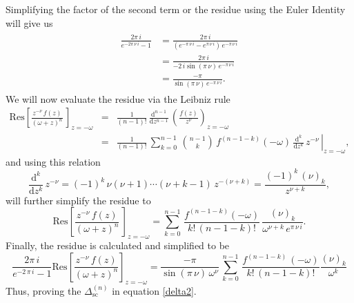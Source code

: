 Simplifying the factor of the second term or the residue using the Euler Identity will give us 
\begin{align}
\begin{split}
	\frac{2\pi\,i}{e^{-2\pi\,\nu\,i}-1} &=\frac{2\pi\,i}{\left(e^{-\pi\,\nu\,i}-e^{\pi\,\nu\,i}\right)\,e^{-\pi\,\nu\,i}} \\& =\frac{2\pi\,i}{-2\,i\sin\left(\pi\,\nu\right)\,e^{-\pi\,\nu\,i}} \\& =\frac{-\pi}{\sin\left(\pi\,\nu\right)\,e^{-\pi\,\nu\,i}}.
\end{split}
\end{align}
We will now evaluate the residue via the Leibniz rule
\begin{eqnarray}\nonumber
	\mathrm{Res}\left[\frac{z^{-\nu}\,f\left(z\right)}{\left(\omega+z\right)^{n}}\,\right]_{z=-\omega} &=&\frac{1}{\left(n-1\right)!}\,\frac{\mathrm{d}^{n-1}}{\mathrm{d}z^{n-1}}\,\left(\frac{f\left(z\right)}{z^{\nu}}\right)_{z=-\omega}\nonumber\\\nonumber
	&=&\frac{1}{\left(n-1\right)!}\,\sum_{k=0}^{n-1}\,{{n-1}\choose{k}}\,f^{(n-1-k)}\left(-\omega\right)\,\left.\frac{\mathrm{d}^{k}}{\mathrm{d}z^{k}}\,z^{-\nu}\,\right|_{z=-\omega},
\end{eqnarray}
and using this relation
\begin{equation}
	\frac{\mathrm{d}^{k}}{\mathrm{d}z^{k}}\,z^{-\nu}=\left(-1\right)^{k}\,\nu\left(\nu+1\right)\cdots\left(\nu+k-1\right)\,z^{-\left(\nu+k\right)}
	=\frac{\left(-1\right)^{k}\,\left(\nu\right)_{k}}{z^{\nu+k}},
\end{equation}
will further simplify the residue to
\begin{equation}
\mathrm{Res}\left[\frac{z^{-\nu}\,f\left(z\right)}{\left(\omega+z\right)^{n}}\,\right]_{z=-\omega}  = \sum_{k=0}^{n-1}\,\frac{f^{(n-1-k)}\left(-\omega\right)}{k!\,\left(n-1-k\right)!}\,\frac{\left(\nu\right)_{k}}{\omega^{\nu+k}\,e^{\pi\,\nu\,i}}.
\end{equation}
Finally, the residue is calculated and simplified to be
\begin{equation}\label{rey}
	\frac{2\pi\,i}{e^{-2\,\pi\,i}-1}\mathrm{Res}\left[\frac{z^{-\nu}\,f\left(z\right)}{\left(\omega+z\right)^{n}}\right]_{z=-\omega}=\frac{-\pi}{\sin\left(\pi\,\nu\right)\,\omega^{\nu}}\,\sum_{k=0}^{n-1}\,\frac{f^{(n-1-k)}\,\left(-\omega\right)}{k!\,\left(n-1-k\right)!}\frac{\left(\nu\right)_{k}}{\omega^{k}}
\end{equation} 
Thus, proving the $\Delta_{\mathrm{sc}}^{(n)}$ in equation \eqref{delta2}.

